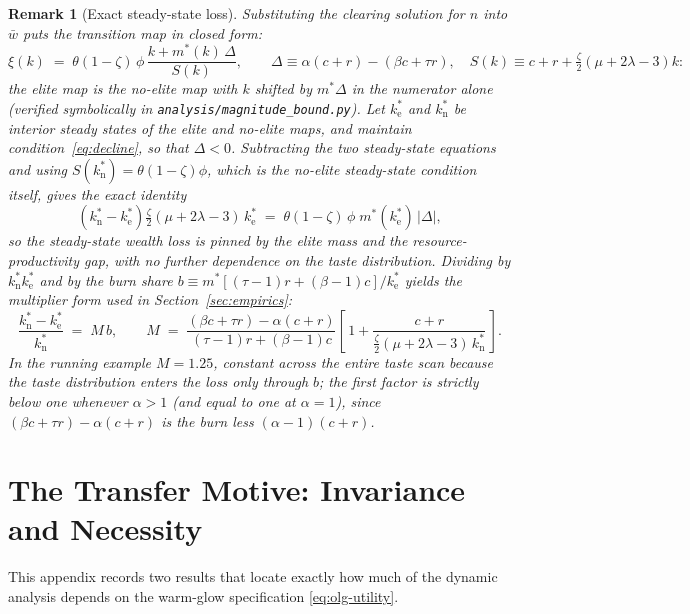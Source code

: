 \documentclass[12pt,letterpaper]{article}
\newtheorem{remark}{Remark}
\theoremstyle{definition}
\begin{document}
\begin{remark}[Exact steady-state loss]\label{rem:loss}
Substituting the clearing solution for $n$ into $\bar{w}$ puts the transition map in closed form:
\[
\xi(k) \;=\; \theta(1-\zeta)\,\phi\,\frac{k + m^\ast(k)\,\Delta}{S(k)},
\qquad
\Delta \equiv \alpha(c+r)-(\beta c+\tau r),
\quad
S(k) \equiv c+r+\tfrac{\zeta}{2}(\mu+2\lambda-3)k :
\]
the elite map is the no-elite map with $k$ shifted by $m^\ast\Delta$ in the numerator alone (verified symbolically in \texttt{analysis/magnitude\_bound.py}).
Let $k^\ast_{\mathrm{e}}$ and $k^\ast_{\mathrm{n}}$ be interior steady states of the elite and no-elite maps, and maintain condition~\eqref{eq:decline}, so that $\Delta<0$.
Subtracting the two steady-state equations and using $S(k^\ast_{\mathrm{n}})=\theta(1-\zeta)\phi$, which is the no-elite steady-state condition itself, gives the exact identity
\[
\left(k^\ast_{\mathrm{n}} - k^\ast_{\mathrm{e}}\right)\tfrac{\zeta}{2}(\mu+2\lambda-3)\,k^\ast_{\mathrm{e}}
\;=\;
\theta(1-\zeta)\,\phi\; m^\ast(k^\ast_{\mathrm{e}})\,\left|\Delta\right| ,
\]
so the steady-state wealth loss is pinned by the elite mass and the resource-productivity gap, with no further dependence on the taste distribution.
Dividing by $k^\ast_{\mathrm{n}}k^\ast_{\mathrm{e}}$ and by the burn share $b\equiv m^\ast\left[(\tau-1)r+(\beta-1)c\right]/k^\ast_{\mathrm{e}}$ yields the multiplier form used in Section~\ref{sec:empirics}:
\[
\frac{k^\ast_{\mathrm{n}}-k^\ast_{\mathrm{e}}}{k^\ast_{\mathrm{n}}} \;=\; M\, b,
\qquad
M \;=\; \frac{(\beta c+\tau r)-\alpha(c+r)}{(\tau-1)r+(\beta-1)c}\left[\,1+\frac{c+r}{\tfrac{\zeta}{2}(\mu+2\lambda-3)\,k^\ast_{\mathrm{n}}}\,\right].
\]
In the running example $M=1.25$, constant across the entire taste scan because the taste distribution enters the loss only through $b$; the first factor is strictly below one whenever $\alpha>1$ (and equal to one at $\alpha=1$), since $(\beta c+\tau r)-\alpha(c+r)$ is the burn less $(\alpha-1)(c+r)$.
\end{remark}

\section{The Transfer Motive: Invariance and Necessity}\label{app:motive}

This appendix records two results that locate exactly how much of the dynamic analysis depends on the warm-glow specification \eqref{eq:olg-utility}.
\end{document}
